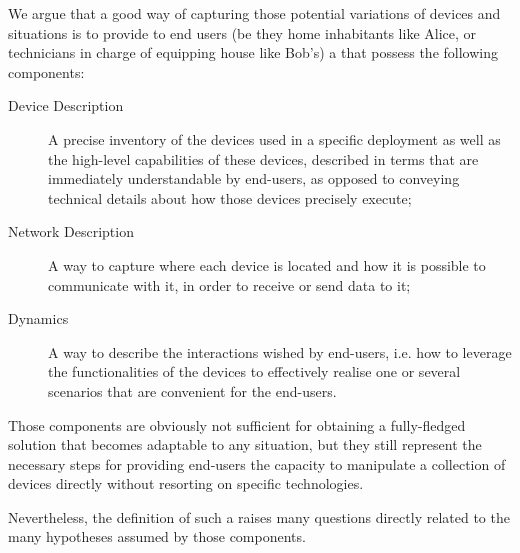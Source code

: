 We argue that a good way of capturing those potential variations of devices and situations is to provide to end users (be they home inhabitants like Alice, or technicians in charge of equipping house like Bob's) a \DSL that possess the following components:
\begin{description}
	\item[Device Description] A precise inventory of the devices used in a specific deployment as well as the high-level capabilities of these devices, described in terms that are immediately understandable by end-users, as opposed to conveying technical details about how those devices precisely execute;
	
	\item[Network Description] A way to capture where each device is located and how it is possible to communicate with it, in order to receive or send data to it;

	\item[Dynamics] A way to describe the interactions wished by end-users, i.e. how to leverage the functionalities of the devices to effectively realise one or several scenarios that are convenient for the end-users.  
	
\end{description}
Those components are obviously not sufficient for obtaining a fully-fledged solution that becomes adaptable to any situation, but they still represent the necessary steps for providing end-users the capacity to manipulate a collection of devices directly without resorting on specific technologies.

Nevertheless, the definition of such a \DSL raises many questions directly related to the many hypotheses assumed by those \DSL components.


















